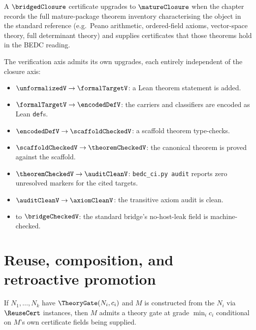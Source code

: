 \begin{definition}
\label{def:upgrade-bridged-to-mature}
A $\bridgedClosure$ certificate upgrades to $\matureClosure$ when the chapter records the full mature-package theorem inventory characterising the object in the standard reference (e.g.\ Peano arithmetic, ordered-field axioms, vector-space theory, full determinant theory) and supplies certificates that those theorems hold in the BEDC reading.
\end{definition}

\begin{definition}
\label{def:verification-upgrades}
The verification axis admits its own upgrades, each entirely independent of the closure axis:
\begin{itemize}
  \item $\unformalizedV \to \formalTargetV$: a Lean theorem statement is added.
  \item $\formalTargetV \to \encodedDefV$: the carriers and classifiers are encoded as Lean \texttt{def}s.
  \item $\encodedDefV \to \scaffoldCheckedV$: a scaffold theorem type-checks.
  \item $\scaffoldCheckedV \to \theoremCheckedV$: the canonical theorem is proved against the scaffold.
  \item $\theoremCheckedV \to \auditCleanV$: \texttt{bedc\_ci.py audit} reports zero unresolved markers for the cited targets.
  \item $\auditCleanV \to \axiomCleanV$: the transitive axiom audit is clean.
  \item to $\bridgeCheckedV$: the standard bridge's no-host-leak field is machine-checked.
\end{itemize}
\end{definition}

\section{Reuse, composition, and retroactive promotion}
\label{sec:closure-reuse}

\begin{theorem}
\label{thm:theory-closure-reuse}
If $N_1, \dotsc, N_k$ have $\TheoryGate(N_i, c_i)$ and $M$ is constructed from the $N_i$ via $\ReuseCert$ instances, then $M$ admits a theory gate at grade $\min_i c_i$ conditional on $M$'s own certificate fields being supplied.
\end{theorem}

